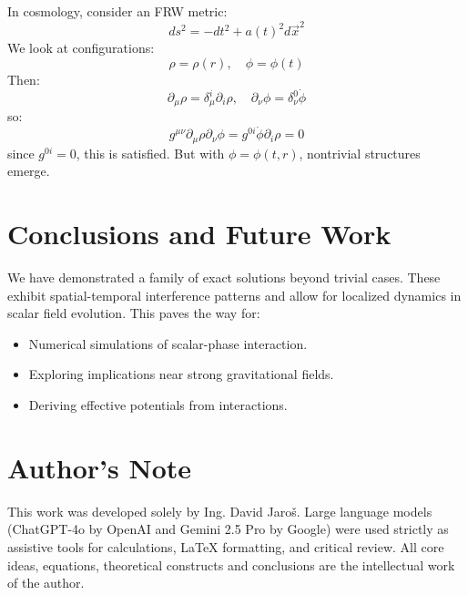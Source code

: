 \documentclass{article}
\begin{document}
In cosmology, consider an FRW metric:
\[
ds^2 = -dt^2 + a(t)^2 d\vec{x}^2
\]
We look at configurations:
\[
\rho = \rho(r), \quad \phi = \phi(t)
\]
Then:
\[
\partial_\mu \rho = \delta^i_\mu \partial_i \rho, \quad
\partial_\nu \phi = \delta^0_\nu \dot{\phi}
\]
so:
\[
g^{\mu\nu} \partial_\mu \rho \partial_\nu \phi = g^{0i} \dot{\phi} \partial_i \rho = 0
\]
since \(g^{0i} = 0\), this is satisfied. But with \(\phi = \phi(t, r)\), nontrivial structures emerge.

\section{Conclusions and Future Work}

We have demonstrated a family of exact solutions beyond trivial cases. These exhibit spatial-temporal interference patterns and allow for localized dynamics in scalar field evolution. This paves the way for:

\begin{itemize}
\item Numerical simulations of scalar-phase interaction.
\item Exploring implications near strong gravitational fields.
\item Deriving effective potentials from interactions.
\end{itemize}


\section*{Author's Note}

This work was developed solely by Ing. David Jaroš.  
Large language models (ChatGPT-4o by OpenAI and Gemini 2.5 Pro by Google) were used strictly as assistive tools for calculations, LaTeX formatting, and critical review.  
All core ideas, equations, theoretical constructs and conclusions are the intellectual work of the author.
\end{document}
